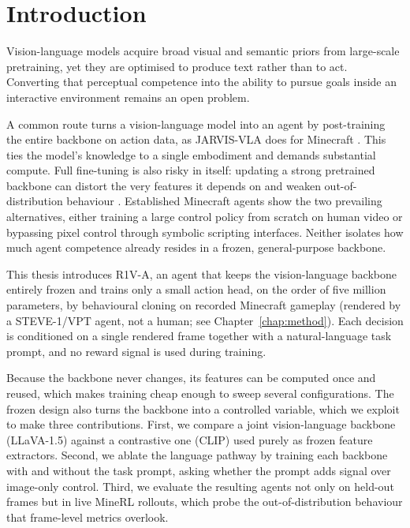 
\chapter{Introduction}
\label{chap:intro}

Vision-language models acquire broad visual and semantic priors from
large-scale pretraining, yet they are optimised to produce text rather
than to act. Converting that perceptual competence into the ability to
pursue goals inside an interactive environment remains an open problem.

A common route turns a vision-language model into an agent by
post-training the entire backbone on action data, as JARVIS-VLA does for
Minecraft \cite{li2025jarvisvla}. This ties the model's knowledge to a
single embodiment and demands substantial compute. Full fine-tuning is
also risky in itself: updating a strong pretrained backbone can distort
the very features it depends on and weaken out-of-distribution behaviour
\cite{kumar2022finetuningdistortpretrainedfeatures}. Established Minecraft
agents show the two prevailing alternatives, either training a large
control policy from scratch on human video \cite{baker2022vpt} or
bypassing pixel control through symbolic scripting interfaces. Neither
isolates how much agent competence already resides in a frozen,
general-purpose backbone.

This thesis introduces R1V-A, an agent that keeps the vision-language
backbone entirely frozen and trains only a small action head, on the
order of five million parameters, by behavioural cloning on recorded
Minecraft gameplay (rendered by a STEVE-1/VPT agent, not a human; see
Chapter~\ref{chap:method}). Each decision is conditioned on a single rendered
frame together with a natural-language task prompt, and no reward signal
is used during training.

Because the backbone never changes, its features can be computed once and
reused, which makes training cheap enough to sweep several configurations.
The frozen design also turns the backbone into a controlled variable,
which we exploit to make three contributions. First, we compare a joint
vision-language backbone (LLaVA-1.5) against a contrastive one (CLIP) used
purely as frozen feature extractors. Second, we ablate the language
pathway by training each backbone with and without the task prompt, asking
whether the prompt adds signal over image-only control. Third, we evaluate
the resulting agents not only on held-out frames but in live MineRL
rollouts, which probe the out-of-distribution behaviour that frame-level
metrics overlook.

